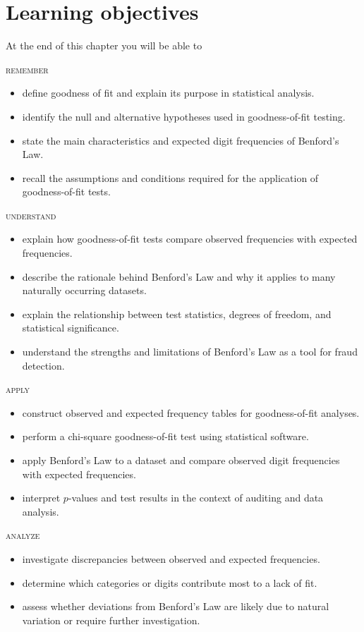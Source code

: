 \section*{Learning objectives}

At the end of this chapter you will be able to

\medskip
\noindent \textsc{remember}

\begin{itemize}
\item define goodness of fit and explain its purpose in statistical analysis.
\item identify the null and alternative hypotheses used in goodness-of-fit testing.
\item state the main characteristics and expected digit frequencies of Benford's Law.
\item recall the assumptions and conditions required for the application of goodness-of-fit tests.
\end{itemize}
\noindent \textsc{understand}
\begin{itemize}
\item explain how goodness-of-fit tests compare observed fre\-quencies with expected frequencies.
\item describe the rationale behind Benford's Law and why it applies to many naturally occurring datasets.
\item explain the relationship between test statistics, degrees of freedom, and statistical significance.
\item understand the strengths and limitations of Benford's Law as a tool for fraud detection.
\end{itemize}
\noindent \textsc{apply}
\begin{itemize}
\item construct observed and expected frequency tables for goodness-of-fit analyses.
\item perform a chi-square goodness-of-fit test using statistical software.
\item apply Benford's Law to a dataset and compare observed digit frequencies with expected frequencies.
\item interpret $p$-values and test results in the context of auditing and data analysis.
\end{itemize}
\noindent \textsc{analyze}
\begin{itemize}
\item investigate discrepancies between observed and expected frequencies.
\item determine which categories or digits contribute most to a lack of fit.
\item assess whether deviations from Benford's Law are likely due to natural variation or require further investigation.
\end{itemize}
